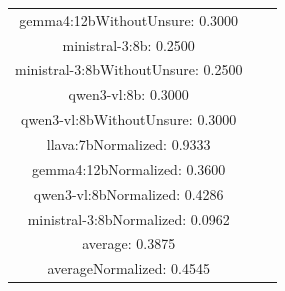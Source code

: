 \documentclass[a4paper]{article}
\begin{document}
\begin{tabular}{ccc}
gemma4:12bWithoutUnsure: 0.3000 \\ ministral-3:8b: 0.2500 \\ ministral-3:8bWithoutUnsure: 0.2500 \\ qwen3-vl:8b: 0.3000 \\ qwen3-vl:8bWithoutUnsure: 0.3000 \\ llava:7bNormalized: 0.9333 \\ gemma4:12bNormalized: 0.3600 \\ qwen3-vl:8bNormalized: 0.4286 \\ ministral-3:8bNormalized: 0.0962 \\ average: 0.3875 \\ averageNormalized: 0.4545 \end{minipage}\\
\end{tabular}

\vspace{5mm}
\end{document}
